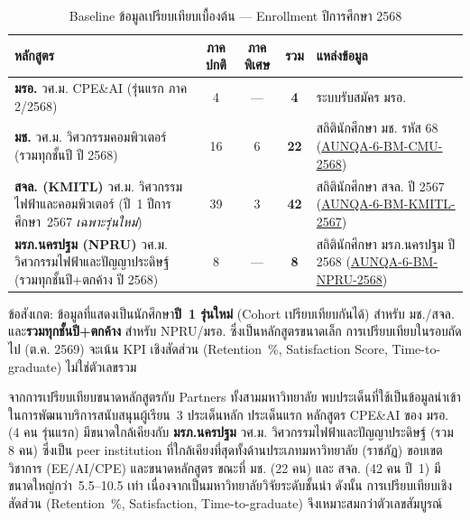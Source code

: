 \begin{table}[H]
  \centering
  \caption{Baseline ข้อมูลเปรียบเทียบเบื้องต้น --- Enrollment ปีการศึกษา 2568}
  \label{tbl:benchmark_baseline_2568}
  \begingroup
  \footnotesize
  \setlength{\tabcolsep}{4pt}
  \renewcommand{\arraystretch}{1.2}
  \begin{tabularx}{\linewidth}{|>{\raggedright\arraybackslash}X|c|c|c|>{\raggedright\arraybackslash}p{3cm}|}
    \hline
    \textbf{หลักสูตร} & \textbf{ภาคปกติ} & \textbf{ภาคพิเศษ} & \textbf{รวม} & \textbf{แหล่งข้อมูล} \\
    \hline
    \textbf{มรอ.} วศ.ม. CPE\&AI (รุ่นแรก ภาค 2/2568) & 4 & --- & \textbf{4} & ระบบรับสมัคร มรอ. \\
    \hline
    \textbf{มช.} วศ.ม. วิศวกรรมคอมพิวเตอร์ (รวมทุกชั้นปี ปี 2568) & 16 & 6 & \textbf{22} & สถิตินักศึกษา มช. รหัส 68 (\hyperlink{ref:AUNQA-6-BM-CMU-2568}{AUNQA-6-BM-CMU-2568}) \\
    \hline
    \textbf{สจล. (KMITL)} วศ.ม. วิศวกรรมไฟฟ้าและคอมพิวเตอร์ (ปี~1 ปีการศึกษา~2567 \textit{เฉพาะรุ่นใหม่}) & 39 & 3 & \textbf{42} & สถิตินักศึกษา สจล. ปี 2567 (\hyperlink{ref:AUNQA-6-BM-KMITL-2567}{AUNQA-6-BM-KMITL-2567}) \\
    \hline
    \textbf{มรภ.นครปฐม (NPRU)} วศ.ม. วิศวกรรมไฟฟ้าและปัญญาประดิษฐ์ (รวมทุกชั้นปี+ตกค้าง ปี 2568) & 8 & --- & \textbf{8} & สถิตินักศึกษา มรภ.นครปฐม ปี 2568 (\hyperlink{ref:AUNQA-6-BM-NPRU-2568}{AUNQA-6-BM-NPRU-2568}) \\
    \hline
  \end{tabularx}
  \endgroup
  \begin{flushleft}
    \footnotesize ข้อสังเกต: ข้อมูลที่แสดงเป็นนักศึกษา\textbf{ปี~1 รุ่นใหม่} (Cohort เปรียบเทียบกันได้) สำหรับ มช./สจล. และ\textbf{รวมทุกชั้นปี+ตกค้าง} สำหรับ NPRU/มรอ. ซึ่งเป็นหลักสูตรขนาดเล็ก การเปรียบเทียบในรอบถัดไป (ต.ค. 2569) จะเน้น KPI เชิงสัดส่วน (Retention~\%, Satisfaction Score, Time-to-graduate) ไม่ใช่ตัวเลขรวม
  \end{flushleft}
\end{table}

จากการเปรียบเทียบขนาดหลักสูตรกับ Partners ทั้งสามมหาวิทยาลัย พบประเด็นที่ใช้เป็นข้อมูลนำเข้าในการพัฒนาบริการสนับสนุนผู้เรียน~3 ประเด็นหลัก ประเด็นแรก หลักสูตร CPE\&AI ของ มรอ. (4 คน รุ่นแรก) มีขนาดใกล้เคียงกับ \textbf{มรภ.นครปฐม} วศ.ม. วิศวกรรมไฟฟ้าและปัญญาประดิษฐ์ (รวม 8 คน) ซึ่งเป็น peer institution ที่ใกล้เคียงที่สุดทั้งด้านประเภทมหาวิทยาลัย (ราชภัฏ) ขอบเขตวิชาการ (EE/AI/CPE) และขนาดหลักสูตร ขณะที่ มช. (22 คน) และ สจล. (42 คน ปี~1) มีขนาดใหญ่กว่า~5.5--10.5 เท่า เนื่องจากเป็นมหาวิทยาลัยวิจัยระดับชั้นนำ ดังนั้น การเปรียบเทียบเชิงสัดส่วน (Retention~\%, Satisfaction, Time-to-graduate) จึงเหมาะสมกว่าตัวเลขสัมบูรณ์

